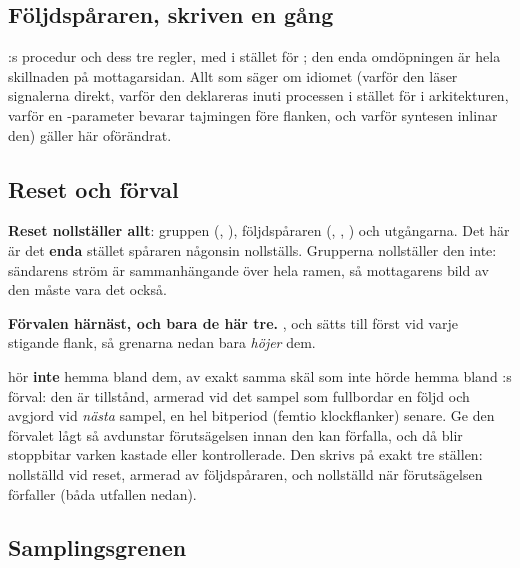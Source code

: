 \subsection{Följdspåraren, skriven en gång}
\label{c15:sub:tracker}

:s procedur  och dess tre regler, med  i stället
för ; den enda omdöpningen är hela skillnaden på mottagarsidan. Allt som
 säger om idiomet (varför den läser signalerna direkt, varför den deklareras
inuti processen i stället för i arkitekturen, varför en -parameter bevarar tajmingen före
flanken, och varför syntesen inlinar den) gäller här oförändrat.

\subsection{Reset och förval}
\label{c15:sub:defaults}

\textbf{Reset nollställer allt}: gruppen (, ), följdspåraren
(, , ) och utgångarna. Det här är det
\textbf{enda} stället spåraren någonsin nollställs. Grupperna nollställer den inte: sändarens ström
är sammanhängande över hela ramen, så mottagarens bild av den måste vara det också.

\textbf{Förvalen härnäst, och bara de här tre.} ,  och
 sätts till  först vid varje stigande flank, så grenarna nedan bara
\emph{höjer} dem.

\begin{warning}
 hör \textbf{inte} hemma bland dem, av exakt samma skäl som 
inte hörde hemma bland :s förval: den är tillstånd, armerad vid det sampel som
fullbordar en följd och avgjord vid \emph{nästa} sampel, en hel bitperiod (femtio klockflanker)
senare. Ge den förvalet lågt så avdunstar förutsägelsen innan den kan förfalla, och då blir
stoppbitar varken kastade eller kontrollerade. Den skrivs på exakt tre ställen: nollställd vid reset,
armerad av följdspåraren, och nollställd när förutsägelsen förfaller (båda utfallen nedan).
\end{warning}

\subsection{Samplingsgrenen}
\label{c15:sub:sample}

